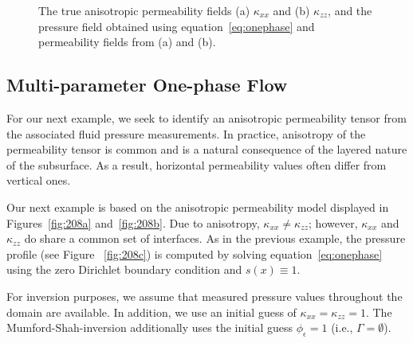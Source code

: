 \documentclass[manuscript,revised]{geophysics}
\begin{document}
{\begin{figure}
\caption{The true anisotropic permeability fields (a) $\kappa_{xx}$ and (b) $\kappa_{zz}$, and the pressure field obtained using equation~\ref{eq:onephase} and permeability fields from (a) and (b).}
\label{fig:208}
\end{figure}
}

\subsection{Multi-parameter One-phase Flow}
For our next example, we seek to identify an anisotropic permeability tensor from the associated fluid pressure measurements.  In practice, anisotropy of the permeability tensor is common and is a natural consequence of the layered nature of the subsurface.  As a result, horizontal permeability values often differ from vertical ones.

Our next example is based on the anisotropic permeability model displayed in Figures~\ref{fig:208a} and~\ref{fig:208b}.  Due to anisotropy, $\kappa_{xx} \neq \kappa_{zz}$; however, $\kappa_{xx}$ and $\kappa_{zz}$ do share a common set of interfaces.  As in the previous example, the pressure profile (see Figure ~\ref{fig:208c}) is  computed by solving equation~\ref{eq:onephase} using the zero Dirichlet boundary condition and $s(x) \equiv 1$.  

For inversion purposes, we assume that measured pressure values throughout the domain are available.  In addition, we use an initial guess of $\kappa_{xx}=\kappa_{zz}=1$.  The Mumford-Shah-inversion additionally uses the initial guess $\phi_\epsilon=1$ (i.e., $\Gamma=\emptyset$).
\end{document}
